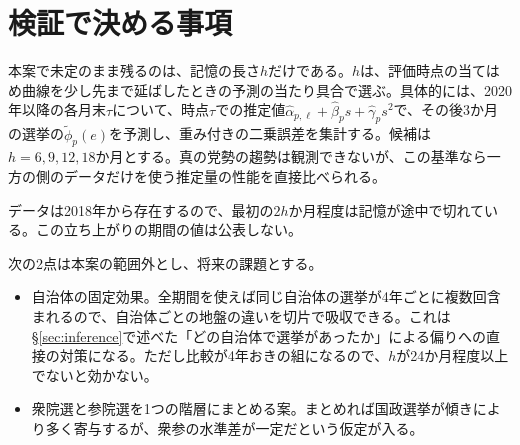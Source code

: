 \documentclass[a4paper,11pt]{ltjsarticle}
\begin{document}
\section{検証で決める事項}
\label{sec:validation}

本案で未定のまま残るのは、記憶の長さ$h$だけである。$h$は、評価時点の当てはめ曲線を少し先まで延ばしたときの予測の当たり具合で選ぶ。具体的には、2020年以降の各月末$\tau$について、時点$\tau$での推定値$\hat\alpha_{p,\ell}+\hat\beta_p s+\hat\gamma_p s^2$で、その後3か月の選挙の$\tilde\phi_p(e)$を予測し、重み付きの二乗誤差を集計する。候補は$h=6,9,12,18$か月とする。真の党勢の趨勢は観測できないが、この基準なら一方の側のデータだけを使う推定量の性能を直接比べられる。

データは2018年から存在するので、最初の$2h$か月程度は記憶が途中で切れている。この立ち上がりの期間の値は公表しない。

次の2点は本案の範囲外とし、将来の課題とする。

\begin{itemize}
  \item 自治体の固定効果。全期間を使えば同じ自治体の選挙が4年ごとに複数回含まれるので、自治体ごとの地盤の違いを切片で吸収できる。これは\S\ref{sec:inference}で述べた「どの自治体で選挙があったか」による偏りへの直接の対策になる。ただし比較が4年おきの組になるので、$h$が24か月程度以上でないと効かない。
  \item 衆院選と参院選を1つの階層にまとめる案。まとめれば国政選挙が傾きにより多く寄与するが、衆参の水準差が一定だという仮定が入る。
\end{itemize}
\end{document}
